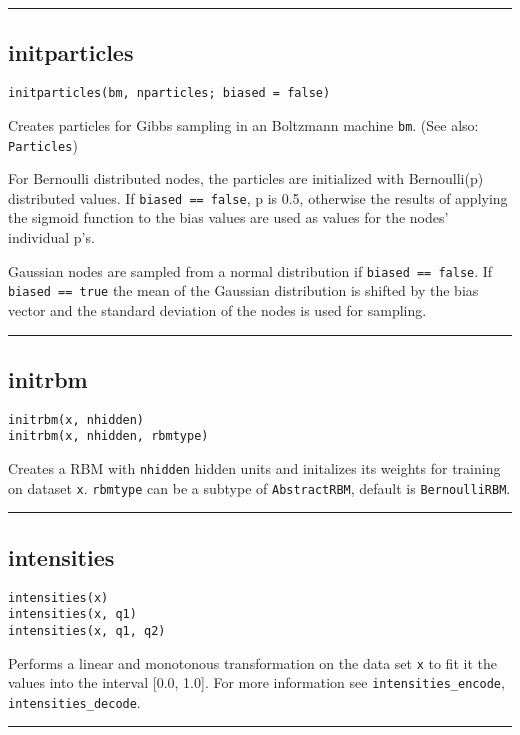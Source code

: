 \noindent\rule{\textwidth}{1pt}
\subsection*{initparticles}
\begin{verbatim}
initparticles(bm, nparticles; biased = false)
\end{verbatim}
Creates particles for Gibbs sampling in an Boltzmann machine \texttt{bm}. (See also: \texttt{Particles})

For Bernoulli distributed nodes, the particles are initialized with Bernoulli(p) distributed values. If \texttt{biased == false}, p is 0.5, otherwise the results of applying the sigmoid function to the bias values are used as values for the nodes' individual p's.

Gaussian nodes are sampled from a normal distribution if \texttt{biased == false}. If \texttt{biased == true} the mean of the Gaussian distribution is shifted by the bias vector and the standard deviation of the nodes is used for sampling.

\noindent\rule{\textwidth}{1pt}
\subsection*{initrbm}
\begin{verbatim}
initrbm(x, nhidden)
initrbm(x, nhidden, rbmtype)
\end{verbatim}
Creates a RBM with \texttt{nhidden} hidden units and initalizes its weights for training on dataset \texttt{x}. \texttt{rbmtype} can be a subtype of \texttt{AbstractRBM}, default is \texttt{BernoulliRBM}.

\noindent\rule{\textwidth}{1pt}
\subsection*{intensities}
\begin{verbatim}
intensities(x)
intensities(x, q1)
intensities(x, q1, q2)
\end{verbatim}
Performs a linear and monotonous transformation on the data set \texttt{x} to fit it the values into the interval [0.0, 1.0]. For more information see \texttt{intensities\_encode}, \texttt{intensities\_decode}.

\noindent\rule{\textwidth}{1pt}
